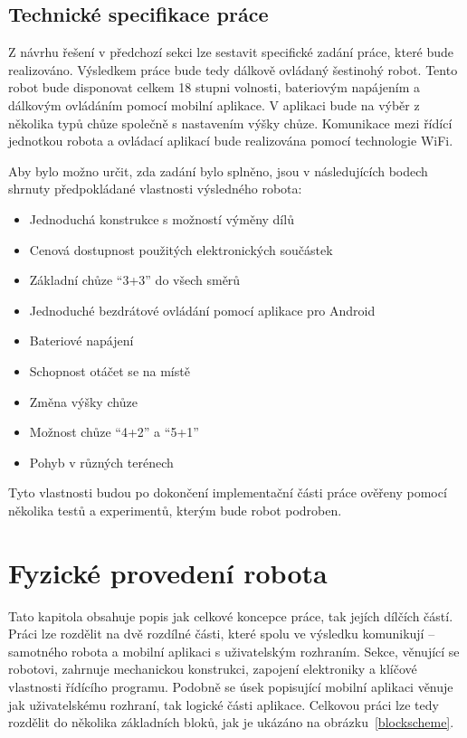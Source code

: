 \section{Technické specifikace práce}
\label{specs}
Z návrhu řešení v předchozí sekci lze sestavit specifické zadání práce, které bude realizováno. Výsledkem práce bude tedy dálkově ovládaný šestinohý robot. Tento robot bude disponovat celkem 18 stupni volnosti, bateriovým napájením a dálkovým ovládáním pomocí mobilní aplikace. V aplikaci bude na výběr z několika typů chůze společně s nastavením výšky chůze. Komunikace mezi řídící jednotkou robota a ovládací aplikací bude realizována pomocí technologie WiFi.

\bigskip
Aby bylo možno určit, zda zadání bylo splněno, jsou v následujících bodech shrnuty předpokládané vlastnosti výsledného robota:
\begin{itemize}
    \item Jednoduchá konstrukce s možností výměny dílů
    \item Cenová dostupnost použitých elektronických součástek
    \item Základní chůze ``3+3'' do všech směrů
    \item Jednoduché bezdrátové ovládání pomocí aplikace pro Android
    \item Bateriové napájení
    \item Schopnost otáčet se na místě
    \item Změna výšky chůze
    \item Možnost chůze ``4+2'' a ``5+1''
    \item Pohyb v různých terénech
\end{itemize}

Tyto vlastnosti budou po dokončení implementační části práce ověřeny pomocí několika testů a experimentů, kterým bude robot podroben.

\chapter{Fyzické provedení robota}
\label{chapterresult}
Tato kapitola obsahuje popis jak celkové koncepce práce, tak jejích dílčích částí. Práci lze rozdělit na dvě rozdílné části, které spolu ve výsledku komunikují -- samotného robota a mobilní aplikaci s uživatelským rozhraním. Sekce, věnující se robotovi, zahrnuje mechanickou konstrukci, zapojení elektroniky a klíčové vlastnosti řídícího programu. Podobně se úsek popisující mobilní aplikaci věnuje jak uživatelskému rozhraní, tak logické části aplikace. Celkovou práci lze tedy rozdělit do několika základních bloků, jak je ukázáno na obrázku~\ref{blockscheme}.

